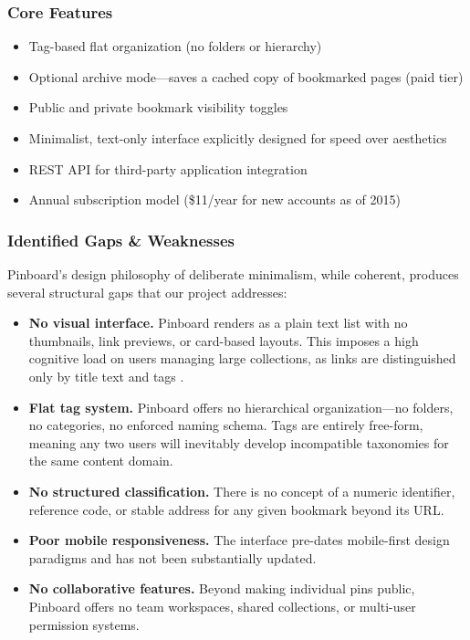 \documentclass[11pt,a4paper]{book}
\begin{document}
\subsubsection{Core Features}
 
\begin{itemize}
    \item Tag-based flat organization (no folders or hierarchy)
    \item Optional archive mode---saves a cached copy of bookmarked pages (paid tier)
    \item Public and private bookmark visibility toggles
    \item Minimalist, text-only interface explicitly designed for speed over aesthetics
    \item REST API for third-party application integration
    \item Annual subscription model (\$11/year for new accounts as of 2015) \citep{pinboard2015pricing}
\end{itemize}
 
\subsubsection{Identified Gaps \& Weaknesses}
 
Pinboard's design philosophy of deliberate minimalism, while coherent, produces several structural gaps that our project addresses:
 
\begin{itemize}
    \item \textbf{No visual interface.} Pinboard renders as a plain text list with no thumbnails, link previews, or card-based layouts. This imposes a high cognitive load on users managing large collections, as links are distinguished only by title text and tags \citep{jones2007keeping}.
    \item \textbf{Flat tag system.} Pinboard offers no hierarchical organization---no folders, no categories, no enforced naming schema. Tags are entirely free-form, meaning any two users will inevitably develop incompatible taxonomies for the same content domain.
    \item \textbf{No structured classification.} There is no concept of a numeric identifier, reference code, or stable address for any given bookmark beyond its URL.
    \item \textbf{Poor mobile responsiveness.} The interface pre-dates mobile-first design paradigms and has not been substantially updated.
    \item \textbf{No collaborative features.} Beyond making individual pins public, Pinboard offers no team workspaces, shared collections, or multi-user permission systems.
\end{itemize}
 
\end{document}
